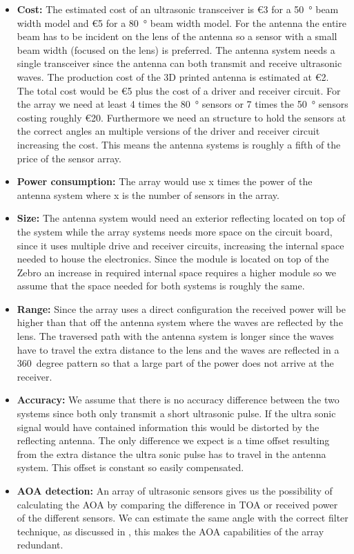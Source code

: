 \begin{itemize}
    \item
      \textbf{Cost:} The estimated cost of an ultrasonic transceiver is \euro{3} for a \SI{50}{\degree} beam width model and \euro{5} for a \SI{80}{\degree} beam width model.
      For the antenna the entire beam has to be incident on the lens of the antenna so a sensor with a small beam width (focused on the lens) is preferred.
      The antenna system needs a single transceiver since the antenna can both transmit and receive ultrasonic waves.
      The production cost of the 3D printed antenna is estimated at \euro{2}.
      The total cost would be \euro{5} plus the cost of a driver and receiver circuit.
      For the array we need at least 4 times the \SI{80}{\degree} sensors or 7 times the \SI{50}{\degree} sensors costing roughly \euro{20}.
      Furthermore we need an structure to hold the sensors at the correct angles an multiple versions of the driver and receiver circuit increasing the cost. This means the antenna systems is roughly a fifth of the price of the sensor array.
    \item
      \textbf{Power consumption:} The array would use x times the power of the antenna system where x is the number of sensors in the array.
    \item
      \textbf{Size:} The antenna system would need an exterior reflecting located on top of the system while the array systems needs more space on the circuit board, since it uses multiple drive and receiver circuits, increasing the internal space needed to house the electronics.
      Since the module is located on top of the Zebro an increase in required internal space requires a higher module so we assume that the space needed for both systems is roughly the same.
    \item
      \textbf{Range:} Since the array uses a direct configuration the received power will be higher than that off the antenna system where the waves are reflected by the lens.
      The traversed path with the antenna system is longer since the waves have to travel the extra distance to the lens and the waves are reflected in a \SI{360}{degree} pattern so that a large part of the power does not arrive at the receiver.
    \item
      \textbf{Accuracy:} We assume that there is no accuracy difference between the two systems since both only transmit a short ultrasonic pulse.
      If the ultra sonic signal would have contained information this would be distorted by the reflecting antenna.
      The only difference we expect is a time offset resulting from the extra distance the ultra sonic pulse has to travel in the antenna system. This offset is constant so easily compensated.
    \item
      \textbf{AOA detection:} An array of ultrasonic sensors gives us the possibility of calculating the AOA by comparing the difference in TOA or received power of the different sensors.
      We can estimate the same angle with the correct filter technique, as discussed in \cite{processing}, this makes the AOA capabilities of the array redundant.
\end{itemize}

